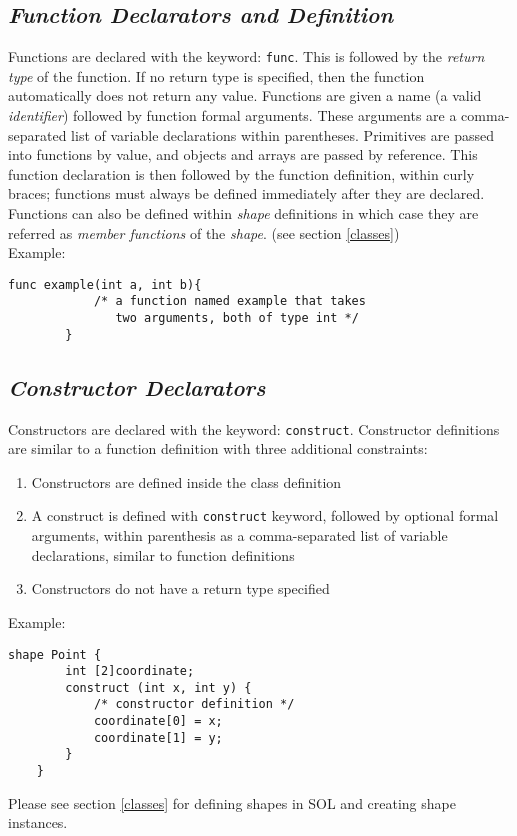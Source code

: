     \subsection{\textit{Function Declarators and Definition}} \label{function}
    Functions are declared with the keyword: \texttt{func}. This is followed by the \textit{return type} of the function. If no return type is specified, then the function automatically does not return any value. Functions are given a name (a valid \textit{identifier}) followed by function formal arguments. These arguments are a comma-separated list of variable declarations within parentheses. Primitives are passed into functions by value, and objects and arrays are passed by reference. This function declaration is then followed by the function definition, within curly braces; functions must always be defined immediately after they are declared.\\
    Functions can also be defined within \textit{shape} definitions in which case they are referred as \textit{member functions} of the \textit{shape}. (see section \ref{classes})\\

    Example:\\
    \begin{lstlisting}[style=sol]
        func example(int a, int b){
            /* a function named example that takes
               two arguments, both of type int */
        }
    \end{lstlisting}

    \subsection{\textit{Constructor Declarators}}
    Constructors are declared with the keyword: \texttt{construct}. Constructor definitions are similar to a function definition with three additional constraints: 
    \begin{enumerate}
        \itemsep0em
        \item Constructors are defined inside the class definition
        \item A construct is defined with \texttt{construct} keyword, followed by optional formal arguments, within parenthesis as a comma-separated list of variable declarations, similar to function definitions
        \item Constructors do not have a return type specified
    \end{enumerate}
    Example:\\
    \begin{lstlisting}[style=sol]
    shape Point {
        int [2]coordinate;
        construct (int x, int y) {
            /* constructor definition */
            coordinate[0] = x;
            coordinate[1] = y;
        }
    }
    \end{lstlisting}
    Please see section \ref{classes} for defining shapes in SOL and creating shape instances.

